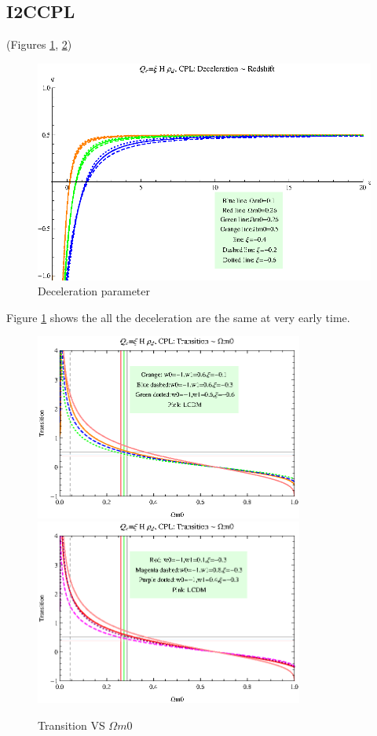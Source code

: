 \documentclass[12pt,a4paper]{article}
\begin{document}
\subsection{I2CCPL}

(Figures \ref{fig-rhod_I2CCPL_DecPara}, \ref{fig-rhod_I2CCPL_TransVSOmegam0})


\begin{figure}
\centering
\includegraphics[width=500pt]{rhod_I2CCPL_DecPara.eps}
\caption{Deceleration parameter}\label{fig-rhod_I2CCPL_DecPara}
\end{figure}

Figure \ref{fig-rhod_I2CCPL_DecPara} shows the all the deceleration are the same at very early time. 




\begin{figure}
\centering
\includegraphics[width=250pt]{rhod_I2CCPL_TransVSOmegam01.eps}
\includegraphics[width=250pt]{rhod_I2CCPL_TransVSOmegam02.eps}
\caption{Transition VS $\Omega m0$}\label{fig-rhod_I2CCPL_TransVSOmegam0}
\end{figure}
\end{document}
